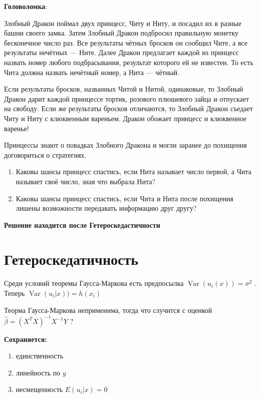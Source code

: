 \documentclass[12pt]{article} %
\theoremstyle{definition} %
\DeclareMathOperator{\Var}{Var}
\begin{document}
\textbf{Головоломка}:
\par Злобный Дракон поймал двух принцесс, Читу и Ниту, и посадил
их в разные башни своего замка. Затем Злобный Дракон подбросил
правильную монетку бесконечное число раз. Все результаты
чётных бросков он сообщил Чите, а все результаты нечётных —
Ните. Далее Дракон предлагает каждой из принцесс назвать номер
любого подбрасывания, результат которого ей не известен. То есть
Чита должна назвать нечётный номер, а Нита — чётный.
\par
Если результаты бросков, названных Читой и Нитой, одинаковые,
то Злобный Дракон дарит каждой принцессе тортик, розового
плюшевого зайца и отпускает на свободу. Если же результаты
бросков отличаются, то Злобный Дракон съедает Читу и Ниту с
клюквенным вареньем. Дракон обожает принцесс и клюквенное
варенье!
\par Принцессы знают о повадках Злобного Дракона и могли заранее до похищения договориться о стратегиях.
\begin{enumerate}
\item{Каковы шансы принцесс спастись, если Нита называет число
первой, а Чита называет своё число, зная что выбрала Нита?}
\item{Каковы шансы принцесс спастись, если Чита и Нита после
похищения лишены возможности передавать информацию
друг другу?}
\end{enumerate}
\par\textbf{Решение находится после Гетероскедастичности}

\section{Гетероскедатичность}

Среди условий теоремы Гаусса-Маркова есть предпосылка $\Var(u_i(x)) = \sigma ^2 $ . Теперь  $\Var(u_i | x)) = h(x_i)$ 

Теорма Гаусса-Маркова неприменима, тогда что случится с оценкой $\hat{\beta}  = (X^T X)^{-1} X^{-1} Y$   ? 
  
\textbf{Сохраняется:}

\begin{enumerate}
\item единственность
\item линейность по $y$
\item несмещенность $E(u_i |x) = 0$
\end{enumerate}

\par
\end{document}
